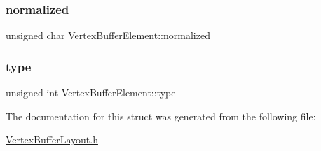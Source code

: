 \mbox{\label{struct_vertex_buffer_element_aa5216544514d8d4c9baab824d6e48c06}} 
\subsubsection{\texorpdfstring{normalized}{normalized}}
{\footnotesize\ttfamily unsigned char Vertex\+Buffer\+Element\+::normalized}

\mbox{\label{struct_vertex_buffer_element_aebaf924b86871f57f006846ba7443676}} 
\subsubsection{\texorpdfstring{type}{type}}
{\footnotesize\ttfamily unsigned int Vertex\+Buffer\+Element\+::type}



The documentation for this struct was generated from the following file\+:\begin{DoxyCompactItemize}
\item 
\mbox{\hyperlink{_vertex_buffer_layout_8h}{Vertex\+Buffer\+Layout.\+h}}\end{DoxyCompactItemize}
